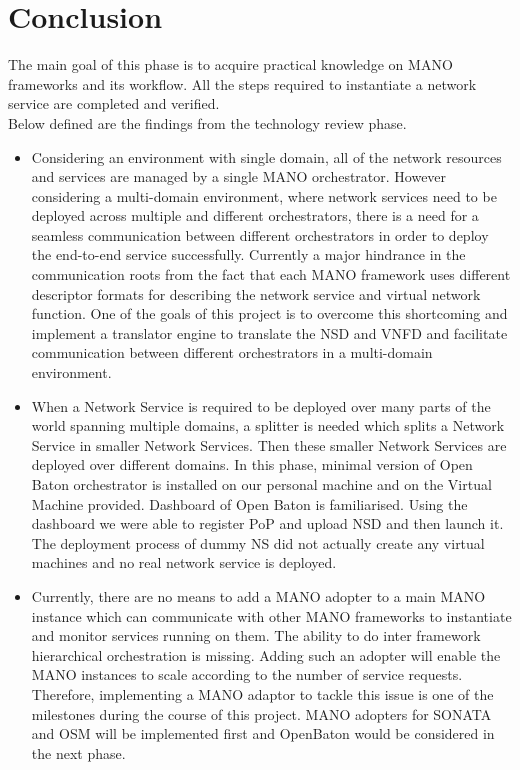 \chapter{Conclusion}
\label{ch:Conclusion}

The main goal of this phase is to acquire practical knowledge on MANO frameworks and its workflow. All the steps required to instantiate a network service are completed and verified.\\

Below defined are the findings from the technology review phase.

\begin{itemize}
	
	\item Considering an environment with single domain, all of the network resources and services are managed by a single MANO orchestrator. However considering a multi-domain
	environment, where network services need to be deployed across multiple and different orchestrators, there is a need for a seamless communication between different orchestrators in order to deploy the end-to-end service successfully. Currently a major hindrance in the communication roots from the fact that each MANO framework uses different descriptor formats for describing the network service and virtual network function. One of the goals of this project is to overcome this shortcoming and  implement a translator engine to translate the NSD and VNFD and facilitate communication between different orchestrators in a multi-domain environment.
	
	\item When a Network Service is required to be deployed over many parts of the world spanning multiple domains, a splitter is needed which splits a Network Service in smaller Network Services. Then these smaller Network Services are deployed over different domains. In this phase, minimal version of Open Baton orchestrator is installed on our personal machine and on the Virtual Machine provided. Dashboard of Open Baton is familiarised. Using the dashboard we were able to register PoP and upload NSD and then launch it. The deployment process of dummy NS did not actually create any virtual machines and no real network service is deployed. 
	 
	\item Currently, there are no means to add a MANO adopter to a main MANO instance which can communicate with other MANO frameworks to instantiate and monitor services running on them. The ability to do inter framework hierarchical orchestration is missing. Adding such an adopter will enable the MANO instances to scale according to the number of service requests. Therefore, implementing a MANO adaptor to tackle this issue is one of the milestones during the course of this project. MANO adopters for SONATA and OSM will be implemented first and OpenBaton would be considered in the next phase.
	 
\end{itemize}





